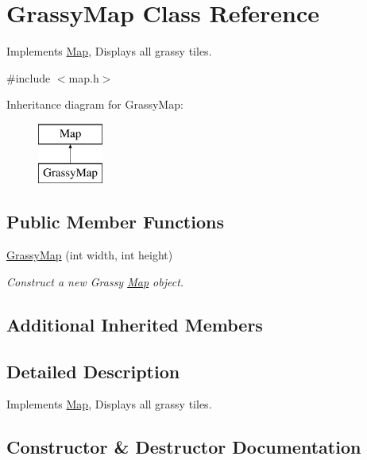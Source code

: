 \hypertarget{classGrassyMap}{}\section{Grassy\+Map Class Reference}
\label{classGrassyMap}


Implements \mbox{\hyperlink{classMap}{Map}}, Displays all grassy tiles.  




{\ttfamily \#include $<$map.\+h$>$}

Inheritance diagram for Grassy\+Map\+:\begin{figure}[H]
\begin{center}
\leavevmode
\includegraphics[height=2.000000cm]{classGrassyMap}
\end{center}
\end{figure}
\subsection*{Public Member Functions}
\begin{DoxyCompactItemize}
\item 
\mbox{\hyperlink{classGrassyMap_ab150f8fa0936231b70c5546b43c5075a}{Grassy\+Map}} (int width, int height)
\begin{DoxyCompactList}\small\item\em Construct a new Grassy \mbox{\hyperlink{classMap}{Map}} object. \end{DoxyCompactList}\end{DoxyCompactItemize}
\subsection*{Additional Inherited Members}


\subsection{Detailed Description}
Implements \mbox{\hyperlink{classMap}{Map}}, Displays all grassy tiles. 



\subsection{Constructor \& Destructor Documentation}
\mbox{\label{classGrassyMap_ab150f8fa0936231b70c5546b43c5075a}} 
